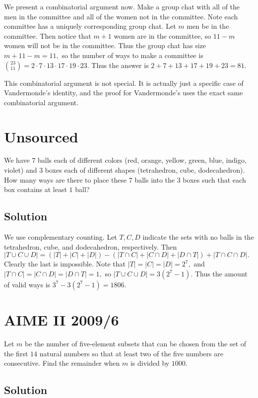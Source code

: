 \documentclass{article}
\begin{document}
We present a combinatorial argument now. Make a group chat with all of the men in the committee and all of the women not in the committee. Note each committee has a uniquely corresponding group chat. Let $m$ men be in the committee. Then notice that $m+1$ women are in the committee, so $11-m$ women will not be in the committee. Thus the group chat has size $m+11-m=11,$ so the number of ways to make a committee is $\binom{23}{11}=2\cdot 7\cdot 13\cdot 17\cdot 19\cdot 23.$ Thus the answer is $2+7+13+17+19+23=81.$

This combinatorial argument is not special. It is actually just a specific case of Vandermonde's identity, and the proof for Vandermonde's uses the exact same combinatorial argument.

\pagebreak\section{Unsourced}
We have $7$ balls each of different colors (red, orange, yellow, green, blue, indigo, violet) and $3$ boxes each of different shapes (tetrahedron, cube, dodecahedron). How many ways are there to place these $7$ balls into the $3$ boxes such that each box contains at least $1$ ball?

\subsection{Solution}

We use complementary counting. Let $T,C,D$ indicate the sets with no balls in the tetrahedron, cube, and dodecahedron, respectively. Then $|T\cup C\cup D|=(|T|+|C|+|D|)-(|T\cap C|+|C\cap D|+|D\cap T|)+|T\cap C\cap D|.$ Clearly the last is impossible. Note that $|T|=|C|=|D|=2^7,$ and $|T\cap C|=|C\cap D|=|D\cap T|=1,$ so $|T\cup C\cup D|=3(2^7-1).$ Thus the amount of valid ways is $3^7-3(2^7-1)=1806.$

\pagebreak\section{AIME II 2009/6}

Let $m$ be the number of five-element subsets that can be chosen from the set of the first $14$ natural numbers so that at least two of the five numbers are consecutive. Find the remainder when $m$ is divided by $1000$.

\subsection{Solution}
\end{document}
